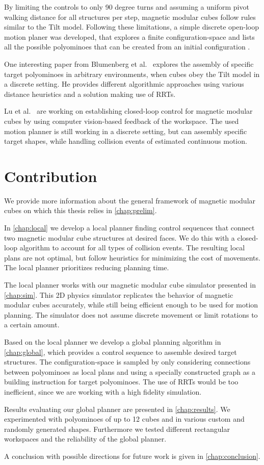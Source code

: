 By limiting the controls to only 90 degree turns and assuming a uniform pivot walking distance for all structures per step, magnetic modular cubes follow rules similar to the Tilt model.
Following these limitations, a simple discrete open-loop motion planer was developed, that explores a finite configuration-space and lists all the possible polyominoes that can be created from an initial configuration \cite{Bhattacharjee2022}.

One interesting paper from Blumenberg et al.\ \cite{blumenberg2023} explores the assembly of specific target polyominoes in arbitrary environments, when cubes obey the Tilt model in a discrete setting.
He provides different algorithmic approaches using various distance heuristics and a solution making use of RRTs.

Lu et al.\ \cite{Lu2023} are working on establishing closed-loop control for magnetic modular cubes by using computer vision-based feedback of the workspace.
The used motion planner is still working in a discrete setting, but can assembly specific target shapes, while handling collision events of estimated continuous motion.



\section{Contribution}

We provide more information about the general framework of magnetic modular cubes on which this thesis relies in \autoref{chap:prelim}.

In \autoref{chap:local} we develop a local planner finding control sequences that connect two magnetic modular cube structures at desired faces.
We do this with a closed-loop algorithm to account for all types of collision events.
The resulting local plans are not optimal, but follow heuristics for minimizing the cost of movements.
The local planner prioritizes reducing planning time. 

The local planner works with our magnetic modular cube simulator presented in \autoref{chap:sim}.
This 2D physics simulator replicates the behavior of magnetic modular cubes accurately, while still being efficient enough to be used for motion planning.
The simulator does not assume discrete movement or limit rotations to a certain amount.

Based on the local planner we develop a global planning algorithm in \autoref{chap:global}, which provides a control sequence to assemble desired target structures.
The configuration-space is sampled by only considering connections between polyominoes as local plans and using a specially constructed graph as a building instruction for target polyominoes.
The use of RRTs would be too inefficient, since we are working with a high fidelity simulation. 

Results evaluating our global planner are presented in \autoref{chap:results}.
We experimented with polyominoes of up to 12 cubes and in various custom and randomly generated shapes.
Furthermore we tested different rectangular workspaces and the reliability of the global planner.  

A conclusion with possible directions for future work is given in \autoref{chap:conclusion}.